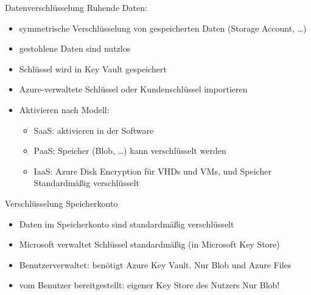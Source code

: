 

\begin{flashcard}[Definition]{Datenverschlüsselung}
    Ruhende Daten:
    \begin{itemize}
        \item symmetrische Verschlüsselung von gespeicherten Daten (Storage Account, \ldots)
        \item gestohlene Daten sind nutzlos
        \item Schlüssel wird in Key Vault gespeichert
        \item Azure-verwaltete Schlüssel oder Kundenschlüssel importieren
        \item Aktivieren nach Modell:
            \begin{itemize}
                \item SaaS: aktivieren in der Software
                \item PaaS: Speicher (Blob, \ldots) kann verschlüsselt werden
                \item IaaS: Azure Disk Encryption für VHDs und VMs, und Speicher\newline
                    Standardmäßig verschlüsselt
            \end{itemize}
    \end{itemize}
\end{flashcard}

\begin{flashcard}[Definition]{Verschlüsselung Speicherkonto}
    \begin{itemize}
        \item Daten im Speicherkonto sind standardmäßig verschlüsselt
        \item Microsoft verwaltet Schlüssel standardmäßig (in Microsoft Key Store)
        \item Benutzerverwaltet: benötigt Azure Key Vault.\newline
            Nur Blob und Azure Files
        \item vom Benutzer bereitgestellt: eigener Key Store des Nutzers\newline
            Nur Blob!
    \end{itemize}
\end{flashcard}

